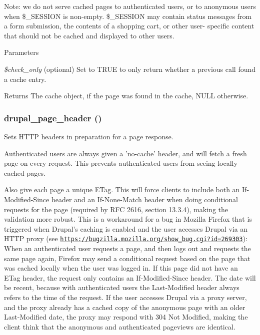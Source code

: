 Note: we do not serve cached pages to authenticated users, or to anonymous users when \$\_\-SESSION is non-\/empty. \$\_\-SESSION may contain status messages from a form submission, the contents of a shopping cart, or other user-\/ specific content that should not be cached and displayed to other users.


\begin{DoxyParams}{Parameters}
\item[{\em \$check\_\-only}](optional) Set to TRUE to only return whether a previous call found a cache entry.\end{DoxyParams}
\begin{DoxyReturn}{Returns}
The cache object, if the page was found in the cache, NULL otherwise. 
\end{DoxyReturn}
\hypertarget{bootstrap_8inc_a05f3dc0377da7898b9cb53977c30cca6}{
\subsubsection[{drupal\_\-page\_\-header}]{\setlength{\rightskip}{0pt plus 5cm}drupal\_\-page\_\-header ()}}
\label{bootstrap_8inc_a05f3dc0377da7898b9cb53977c30cca6}
Sets HTTP headers in preparation for a page response.

Authenticated users are always given a 'no-\/cache' header, and will fetch a fresh page on every request. This prevents authenticated users from seeing locally cached pages.

Also give each page a unique ETag. This will force clients to include both an If-\/Modified-\/Since header and an If-\/None-\/Match header when doing conditional requests for the page (required by RFC 2616, section 13.3.4), making the validation more robust. This is a workaround for a bug in Mozilla Firefox that is triggered when Drupal's caching is enabled and the user accesses Drupal via an HTTP proxy (see \href{https://bugzilla.mozilla.org/show_bug.cgi?id=269303}{\tt https://bugzilla.mozilla.org/show\_\-bug.cgi?id=269303}): When an authenticated user requests a page, and then logs out and requests the same page again, Firefox may send a conditional request based on the page that was cached locally when the user was logged in. If this page did not have an ETag header, the request only contains an If-\/Modified-\/Since header. The date will be recent, because with authenticated users the Last-\/Modified header always refers to the time of the request. If the user accesses Drupal via a proxy server, and the proxy already has a cached copy of the anonymous page with an older Last-\/Modified date, the proxy may respond with 304 Not Modified, making the client think that the anonymous and authenticated pageviews are identical.


